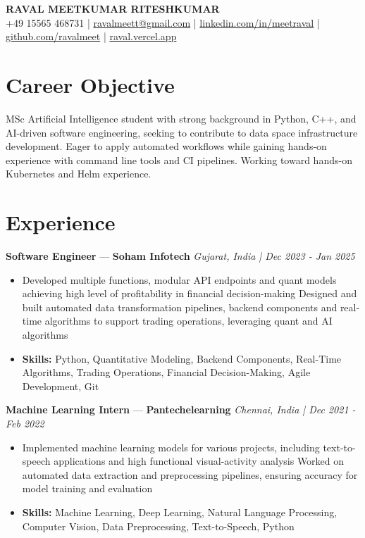 \documentclass[a4paper,10pt]{article}
\begin{document}
\begin{center}
  {\Large\bfseries RAVAL MEETKUMAR RITESHKUMAR}\\[2pt]
  {\small +49 15565 468731 \;|\; \href{mailto:ravalmeett@gmail.com}{ravalmeett@gmail.com} \;|\; \href{https://www.linkedin.com/in/meetraval/}{linkedin.com/in/meetraval} \;|\; \href{https://github.com/ravalmeet}{github.com/ravalmeet} \;|\; \href{https://raval.vercel.app/}{raval.vercel.app}}
\end{center}
\vspace{-3pt}

\section*{Career Objective}
MSc Artificial Intelligence student with strong background in Python, C++, and AI-driven software engineering, seeking to contribute to data space infrastructure development. Eager to apply automated workflows while gaining hands-on experience with command line tools and CI pipelines. Working toward hands-on Kubernetes and Helm experience.\par

\section*{Experience}
\textbf{Software Engineer} — \textbf{Soham Infotech} \hfill \textit{Gujarat, India \;|\; Dec 2023 - Jan 2025}\par
\vspace{1pt}
\begin{itemize}
  \item Developed multiple functions, modular API endpoints and quant models achieving high level of profitability in financial decision-making Designed and built automated data transformation pipelines, backend components and real-time algorithms to support trading operations, leveraging quant and AI algorithms
  \item \textbf{Skills:} Python, Quantitative Modeling, Backend Components, Real-Time Algorithms, Trading Operations, Financial Decision-Making, Agile Development, Git
\end{itemize}
\vspace{3pt}
\textbf{Machine Learning Intern} — \textbf{Pantechelearning} \hfill \textit{Chennai, India \;|\; Dec 2021 - Feb 2022}\par
\vspace{1pt}
\begin{itemize}
  \item Implemented machine learning models for various projects, including text-to-speech applications and high functional visual-activity analysis Worked on automated data extraction and preprocessing pipelines, ensuring accuracy for model training and evaluation
  \item \textbf{Skills:} Machine Learning, Deep Learning, Natural Language Processing, Computer Vision, Data Preprocessing, Text-to-Speech, Python
\end{itemize}
\end{document}
